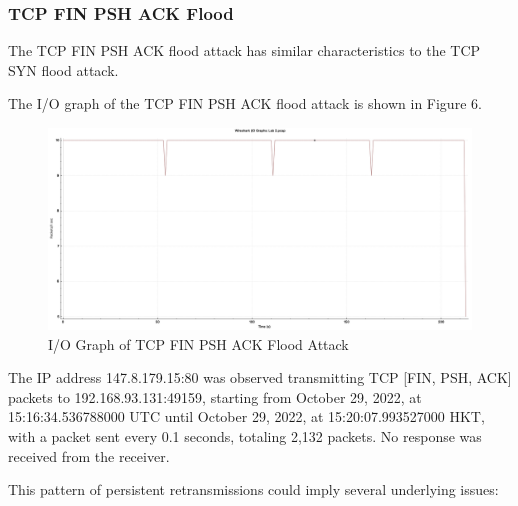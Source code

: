 \documentclass{article}
\begin{document}
    \subsubsection{TCP FIN PSH ACK Flood}\label{subsubsec:tcp-fin-psh-ack-flood}
    The TCP FIN PSH ACK flood attack has similar characteristics to the TCP SYN flood attack. 

    The I/O graph of the TCP FIN PSH ACK flood attack is shown in Figure 6.

    \begin{figure}[H]
        \centering
        \includegraphics[width=\textwidth]{image/15_131_fin_tcp.png}
        \caption{I/O Graph of TCP FIN PSH ACK Flood Attack}
        \label{fig:tcp-fin-psh-ack-flood-io-graph}
    \end{figure}

    The IP address 147.8.179.15:80 was observed transmitting TCP [FIN, PSH, ACK] packets to 192.168.93.131:49159, 
    starting from October 29, 2022, at 15:16:34.536788000 UTC until October 29, 2022, at 15:20:07.993527000 HKT, 
    with a packet sent every 0.1 seconds, totaling 2,132 packets. 
    No response was received from the receiver.

    This pattern of persistent retransmissions could imply several underlying issues:
\end{document}
